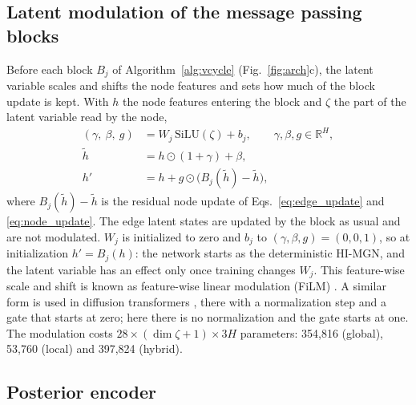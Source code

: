 \documentclass[preprint,12pt]{elsarticle}
\newcommand{\R}{\mathbb{R}}
\begin{document}
\subsection{Latent modulation of the message passing blocks}\label{sec:modulation}

Before each block $B_j$ of Algorithm~\ref{alg:vcycle} (Fig.~\ref{fig:arch}c), the latent variable scales and shifts the
node features and sets how much of the block update is kept. With $h$ the node features entering
the block and $\zeta$ the part of the latent variable read by the node,
\begin{align}
  (\gamma,\ \beta,\ g) &= W_j\,\mathrm{SiLU}(\zeta) + b_j,\qquad
  \gamma,\beta,g\in\R^{H}, \label{eq:mod}\\
  \tilde h &= h\odot(1+\gamma) + \beta, \\
  h' &= h + g\odot\bigl(B_j(\tilde h)-\tilde h\bigr),
\end{align}
where $B_j(\tilde h)-\tilde h$ is the residual node update of Eqs.~\eqref{eq:edge_update} and
\eqref{eq:node_update}. The edge latent states are updated by the block as usual and are not
modulated. $W_j$ is initialized to zero and $b_j$ to $(\gamma,\beta,g)=(0,0,1)$, so at
initialization $h'=B_j(h)$: the network starts as the deterministic HI-MGN, and the latent
variable has an effect only once training changes $W_j$. This feature-wise scale and shift is
known as feature-wise linear modulation (FiLM) \cite{perez2018film}. A similar form is used in
diffusion transformers \cite{peebles2023dit}, there with a normalization step and a gate that
starts at zero; here there is no normalization and the gate starts at one. The modulation costs
$28\times(\dim\zeta+1)\times3H$ parameters: 354,816 (global), 53,760 (local) and 397,824
(hybrid).

\subsection{Posterior encoder}\label{sec:encoder}
\end{document}
